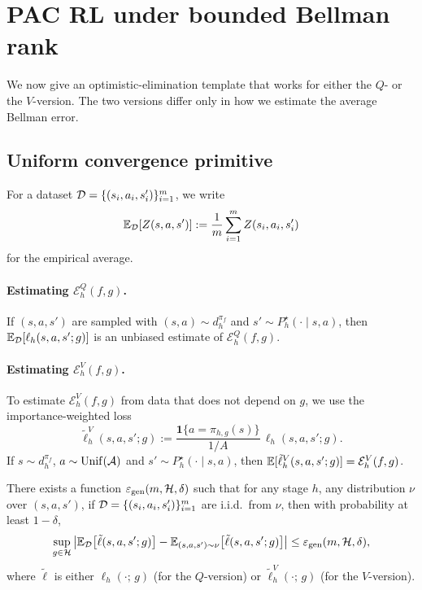 \section{PAC RL under bounded Bellman rank}
\label{sec:br_pac}

We now give an optimistic-elimination template that works for either the $Q$- or the $V$-version.
The two versions differ only in how we estimate the average Bellman error.

\subsection{Uniform convergence primitive}
\label{subsec:br_epsgen}

For a dataset $\mathcal{D}=\{(s_i,a_i,s_i')\}_{i=1}^m$, we write
\[
\mathbb{E}_{\mathcal{D}}[Z(s,a,s')] := \frac{1}{m}\sum_{i=1}^m Z(s_i,a_i,s_i')
\]
for the empirical average.

\paragraph{Estimating $\mathcal{E}_h^{Q}(f,g)$.}
If $(s,a,s')$ are sampled with $(s,a)\sim d_h^{\pi_f}$ and $s'\sim P_h^\star(\cdot\mid s,a)$, then
$\mathbb{E}_{\mathcal{D}}[\ell_h(s,a,s';g)]$ is an unbiased estimate of $\mathcal{E}_h^Q(f,g)$.

\paragraph{Estimating $\mathcal{E}_h^{V}(f,g)$.}
To estimate $\mathcal{E}_h^V(f,g)$ from data that does not depend on $g$, we use the
importance-weighted loss
\begin{equation}
\label{eq:br_v_loss}
\tilde{\ell}_h^{V}(s,a,s';g)
:=
\frac{\mathbf{1}\{a=\pi_{h,g}(s)\}}{1/A}\,\ell_h(s,a,s';g).
\end{equation}
If $s\sim d_h^{\pi_f}$, $a\sim \mathrm{Unif}(\mathcal{A})$ and $s'\sim P_h^\star(\cdot\mid s,a)$, then
$\mathbb{E}[\tilde{\ell}_h^{V}(s,a,s';g)]=\mathcal{E}_h^{V}(f,g)$.

\begin{assumption}
\label{assum:br_uniform_conv}
There exists a function $\varepsilon_{\mathrm{gen}}(m,\mathcal{H},\delta)$ such that for any stage $h$,
any distribution $\nu$ over $(s,a,s')$, if $\mathcal{D}=\{(s_i,a_i,s_i')\}_{i=1}^m$ are i.i.d.\ from $\nu$,
then with probability at least $1-\delta$,
\[
\sup_{g\in\mathcal{H}}\left|
\mathbb{E}_{\mathcal{D}}\big[\tilde{\ell}(s,a,s';g)\big]
-
\mathbb{E}_{(s,a,s')\sim\nu}\big[\tilde{\ell}(s,a,s';g)\big]
\right|
\le
\varepsilon_{\mathrm{gen}}(m,\mathcal{H},\delta),
\]
where $\tilde{\ell}$ is either $\ell_h(\cdot;\,g)$ (for the $Q$-version) or
$\tilde{\ell}_h^{V}(\cdot;\,g)$ (for the $V$-version).
\end{assumption}

